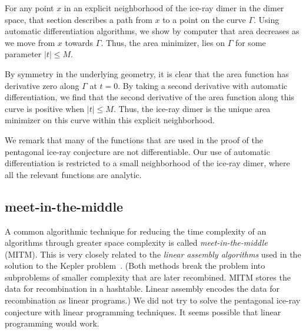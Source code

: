 For any point $x$ in an explicit neighborhood of the ice-ray dimer in
the dimer space, that section describes a path from $x$ to a point on
the curve $\Gamma$.  Using automatic differentiation algorithms, we
show by computer that area decreases as we move from $x$ towards
$\Gamma$.  Thus, the area minimizer, lies on $\Gamma$ for some
parameter $|t|\le M$.

By symmetry in the underlying geometry, it is clear that the area
function has derivative zero along $\Gamma$ at $t=0$. By taking a
second derivative with automatic differentiation, we find that the
second derivative of the area function along this curve is positive
when $|t|\le M$.  Thus, the ice-ray dimer is the unique area minimizer
on this curve within this explicit neighborhood.

We remark that many of the functions that are used in the proof of the
pentagonal ice-ray conjecture are not differentiable.  Our use of
automatic differentiation is restricted to a small neighborhood of the
ice-ray dimer, where all the relevant functions are analytic.

\subsection{meet-in-the-middle}

A common algorithmic technique for reducing the time complexity of an
algorithms through greater space complexity is called {\it
  meet-in-the-middle} (MITM).  This is very closely related to the
{\it linear assembly algorithms} used in the solution to the Kepler
problem~\cite{hales2003some}. (Both methods break the problem into
subproblems of smaller complexity that are later recombined.  MITM
stores the data for recombination in a hashtable.  Linear assembly
encodes the data for recombination as linear programs.)  We did not
try to solve the pentagonal ice-ray conjecture with linear programming
techniques.  It seems possible that linear programming would work.

